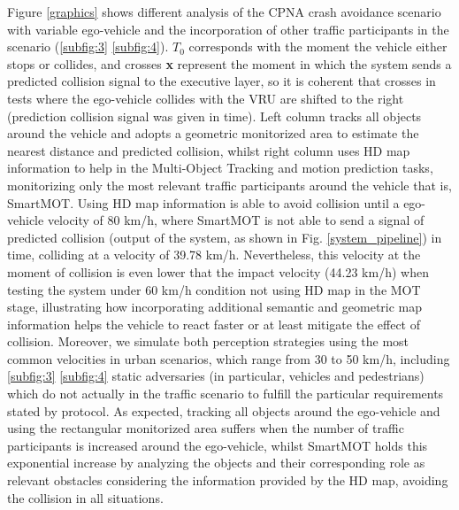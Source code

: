 Figure \ref{graphics} shows different analysis of the CPNA crash avoidance scenario with variable ego-vehicle and the incorporation of other traffic participants in the scenario (\ref{subfig:3} \ref{subfig:4}). \(T_0\) corresponds with the moment the vehicle either stops or collides, and crosses \textbf{x} represent the moment in which the system sends a predicted collision signal to the executive layer, so it is coherent that crosses in tests where the ego-vehicle collides with the VRU are shifted to the right (prediction collision signal was given in time). Left column tracks all objects around the vehicle and adopts a geometric monitorized area to estimate the nearest distance and predicted collision, whilst right column uses HD map information to help in the Multi-Object Tracking and motion prediction tasks, monitorizing only the most relevant traffic participants around the vehicle that is, SmartMOT. Using HD map information is able to avoid collision until a ego-vehicle velocity of 80 km/h, where SmartMOT is not able to send a signal of predicted collision (output of the system, as shown in Fig. \ref{system_pipeline}) in time, colliding at a velocity of 39.78 km/h. Nevertheless, this velocity at the moment of collision is even lower that the impact velocity (44.23 km/h) when testing the system under 60 km/h condition not using HD map in the MOT stage, illustrating how incorporating additional semantic and geometric map information helps the vehicle to react faster or at least mitigate the effect of collision. Moreover, we simulate both perception strategies using the most common velocities in urban scenarios, which range from 30 to 50 km/h, including \ref{subfig:3} \ref{subfig:4} static adversaries (in particular, vehicles and pedestrians) which do not actually in the traffic scenario to fulfill the particular requirements stated by \cite{felipe} protocol. As expected, tracking all objects around the ego-vehicle and using the rectangular monitorized area suffers when the number of traffic participants is increased around the ego-vehicle, whilst SmartMOT holds this exponential increase by analyzing the objects and their corresponding role as relevant obstacles considering the information provided by the HD map, avoiding the collision in all situations.

